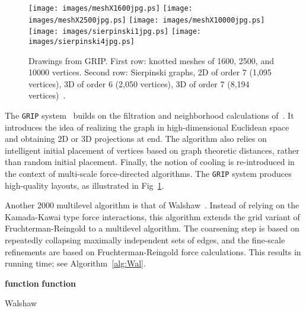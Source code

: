 \documentclass[notitlepage,letter,11pt]{article}
\begin{document}
\begin{figure}[t]
\begin{center}
\texttt{[image: images/meshX1600jpg.ps]}
\texttt{[image: images/meshX2500jpg.ps]}
\texttt{[image: images/meshX10000jpg.ps]}\\
\texttt{[image: images/sierpinski1jpg.ps]}
\texttt{[image: images/sierpinski4jpg.ps]}
\end{center}
\caption{\small\sf Drawings from GRIP. First row: knotted
  meshes of 1600, 2500, and 10000 vertices. Second row: Sierpinski graphs, 2D of order 7
(1,095 vertices), 3D of order 6 (2,050 vertices), 3D of order 7 (8,194 vertices)~\cite{gk-grip-00}.}
  \label{fd:fig:grip}
\end{figure}
The {\tt GRIP} system~\cite{gk-grip-00} builds on the filtration and neighborhood calculations
of~\cite{ggk-afmda-00j}. It introduces the idea of realizing the graph in
high-dimensional Euclidean space and obtaining 2D or 3D projections at
end. The algorithm also relies on intelligent initial placement of
vertices based on graph theoretic distances, rather than random
initial placement. Finally, the notion of cooling is re-introduced in
the context of multi-scale force-directed algorithms.  The {\tt GRIP}
system produces high-quality layouts, as illustrated in Fig~\ref{fd:fig:grip}.





Another 2000 multilevel algorithm is that
of Walshaw~\cite{w-mafdgd-j-03}. Instead of relying on the
Kamada-Kawai type force interactions, this algorithm extends the grid
variant of Fruchterman-Reingold to a  multilevel algorithm. The
coarsening step is based on repeatedly collapsing maximally
independent sets of edges, and the fine-scale refinements are based on
Fruchterman-Reingold force calculations. This results in  running time;  see Algorithm~\ref{alg:Wal}.


\begin{algorithm}
{\bf function}  
           {\bf function}   
	   \;
\caption{Walshaw \label{alg:Wal}}
\end{algorithm}
\end{document}
